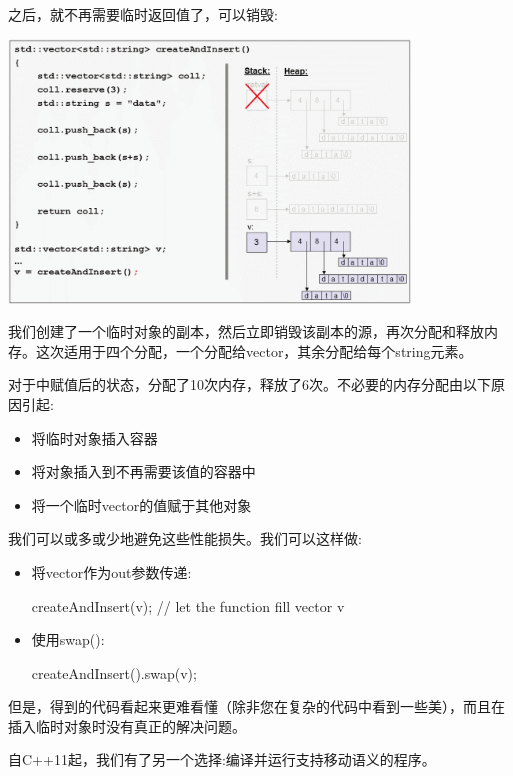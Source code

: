 \begin{itemize}
\begin{center}
	\end{center}
	之后，就不再需要临时返回值了，可以销毁:
\begin{center}
		\includegraphics[width=0.8\textwidth]{part1/ch1/images/9}
	\end{center}
	我们创建了一个临时对象的副本，然后立即销毁该副本的源，再次分配和释放内存。这次适用于四个分配，一个分配给vector，其余分配给每个string元素。
\end{itemize}

对于中赋值后的状态，分配了10次内存，释放了6次。不必要的内存分配由以下原因引起:

\begin{itemize}
	\item 将临时对象插入容器
	\item 将对象插入到不再需要该值的容器中
	\item 将一个临时vector的值赋于其他对象
\end{itemize}

我们可以或多或少地避免这些性能损失。我们可以这样做:

\begin{itemize}
	\item 将vector作为out参数传递:
\begin{cppcode}
createAndInsert(v); // let the function fill vector v
\end{cppcode}
	\item 使用swap():
\begin{cppcode}
createAndInsert().swap(v);
\end{cppcode}
\end{itemize}

但是，得到的代码看起来更难看懂（除非您在复杂的代码中看到一些美），而且在插入临时对象时没有真正的解决问题。

自C++11起，我们有了另一个选择:编译并运行支持移动语义的程序。

